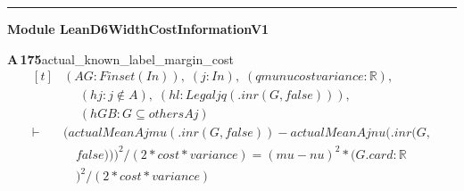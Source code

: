 \documentclass[conference]{IEEEtran}
\theoremstyle{definition}
\newcommand{\lean}[1]{\textsf{\footnotesize #1}}
\begin{document}
\vspace{4pt}\noindent\rule{\columnwidth}{0.4pt}\par\vspace{2pt}
\noindent\textbf{Module \lean{LeanD6WidthCostInformationV1}}\par\vspace{3pt}

\noindent\textbf{A\,175}\quad\lean{actual\_known\_label\_margin\_cost}
{\footnotesize\[ \begin{aligned}[t]
&(\mathit{A} \mathit{G} : \mathit{Finset} (\mathit{I} \mathit{n})),\; (\mathit{j} : \mathit{I} \mathit{n}),\; (\mathit{q} \mathit{mu} \mathit{nu} \mathit{cost} \mathit{variance} : \mathbb{R} ),\\
&\quad \; (\mathit{hj} : \mathit{j} \notin \mathit{A}),\; (\mathit{hl} : \mathit{Legal} \mathit{j} \mathit{q} (.\mathit{inr} (\mathit{G},\mathit{false}))),\\
&\quad \; (\mathit{hGB} : \mathit{G} \subseteq \mathit{others} \mathit{A} \mathit{j})\\
\vdash\;&(\mathit{actualMean} \mathit{A} \mathit{j} \mathit{mu} (.\mathit{inr} (\mathit{G},\mathit{false}))-\mathit{actualMean} \mathit{A} \mathit{j} \mathit{nu} (.\mathit{inr} (\mathit{G},\\
&\quad \mathit{false})))^{2}/ (2*\mathit{cost}*\mathit{variance}) = (\mathit{mu}-\mathit{nu})^{2}*(\mathit{G}.\mathit{card}:\mathbb{R}\\
&\quad )^{2}/(2*\mathit{cost}*\mathit{variance})
\end{aligned} \]}
\end{document}
